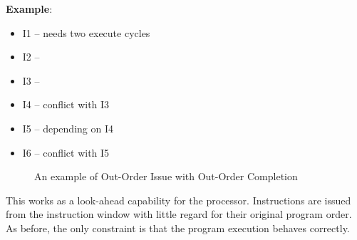 \textbf{Example}:

\begin{itemize}
\item I1 – needs two execute cycles
\item I2 –
\item I3 –
\item I4 – conflict with I3
\item I5 – depending on I4
\item I6 – conflict with I5
\end{itemize}

\begin{figure}[H]
  \centering
  \caption{An example of Out-Order Issue with Out-Order Completion}
  \label{fig:OOI-OOC}
\end{figure}

This works as a look-ahead capability for the processor. Instructions are issued from the instruction window with little regard for their original program order. As before, the only constraint is that the program execution behaves correctly.

